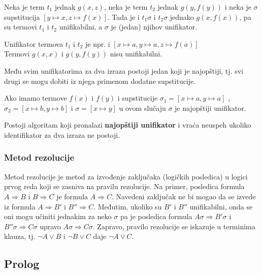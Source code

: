 \documentclass[../main.tex]{subfiles}
\begin{document}
\begin{description}
Neka je term $t_1$ jednak $g(x,z)$, neka je term $t_2$ jednak $g(y,f(y))$ i neka je $\sigma$ supstitucija $[y \mapsto x, z\mapsto f(x)]$. Tada je i $t_1\sigma$ i $t_2\sigma$ jednako $g(x,f(x))$, pa su termovi $t_1$ i $t_2$ unifikabilni, a $\sigma$ je (jedan) njihov unifikator.
\begin{boxprimer}[width=\linewidth/3*2]
Unifikator termova $t_1$ i $t_2$ je npr. i $[x\mapsto a, y\mapsto a, z\mapsto f(a)]$
\\
Termovi $g(x,x)$ i $g(y,f(y))$ nisu unifikabilni.
\end{boxprimer}
Među svim unifikatorima za dva izraza postoji jedan koji je najopštiji, tj. svi drugi se mogu dobiti iz njega primenom dodatne supstitucije. 

\begin{boxprimer}
Ako imamo termove $f(x)$ i $f(y)$ i supstitucije $\sigma_1 = [x\mapsto a, y\mapsto a]$ , $\sigma_2 = [x\mapsto b, y\mapsto b]$ i $\sigma = [x\mapsto y]$ u ovom slučaju $\sigma$ je najopštiji unifikator.
\end{boxprimer}

Postoji algoritam koji pronalazi {\bf najopštiji unifikator} i vraća neuspeh ukoliko identifikator za dva izraza ne postoji.

\end{description}

\subsubsection{Metod rezolucije}
Metod rezolucije je metod za izvođenje zaključaka (logičkih posledica) u logici prvog reda koji se zasniva na pravilu rezolucije. Na primer, posledica formula $A \Rightarrow B$ i $B\Rightarrow C$ je formula $A \Rightarrow C$. Navedeni zaključak ne bi mogao da se izvede iz formula $A \Rightarrow B'$ i $B'' \Rightarrow C$. Međutim, ukoliko su $B'$ i $B''$ unifikabilni, onda se oni mogu učiniti jednakim za neko $\sigma$ pa je posledica formula $A\sigma \Rightarrow B'\sigma$ i $B''\sigma \Rightarrow C\sigma$ upravo $A\sigma \Rightarrow C\sigma$. Zapravo, pravilo rezolucije se iskazuje u terminima klauza, tj. $\neg A \vee B$ i $\neg B \vee C$ daje $\neg A \vee C$.


\begin{boxnaslovi}
\section{Prolog}
\end{boxnaslovi}
\end{document}
